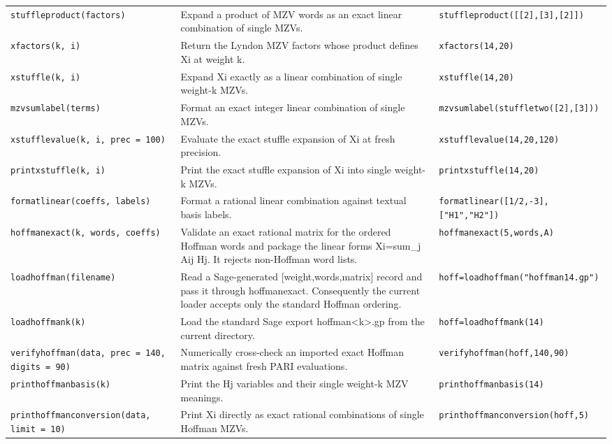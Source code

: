 \documentclass[12pt]{amsproc}
\newcommand{\code}[1]{\nolinkurl{#1}}
\begin{document}
\begin{longtable}{@{}L{0.245\textwidth}L{0.440\textwidth}L{0.245\textwidth}@{}}
\addlinespace[2pt]
\code{stuffleproduct(factors)} & Expand a product of MZV words as an exact linear combination of single MZVs. & \code{stuffleproduct([[2],[3],[2]])} \\
\addlinespace[2pt]
\code{xfactors(k, i)} & Return the Lyndon MZV factors whose product defines Xi at weight k. & \code{xfactors(14,20)} \\
\addlinespace[2pt]
\code{xstuffle(k, i)} & Expand Xi exactly as a linear combination of single weight-k MZVs. & \code{xstuffle(14,20)} \\
\addlinespace[2pt]
\code{mzvsumlabel(terms)} & Format an exact integer linear combination of single MZVs. & \code{mzvsumlabel(stuffletwo([2],[3]))} \\
\addlinespace[2pt]
\code{xstufflevalue(k, i, prec = 100)} & Evaluate the exact stuffle expansion of Xi at fresh precision. & \code{xstufflevalue(14,20,120)} \\
\addlinespace[2pt]
\code{printxstuffle(k, i)} & Print the exact stuffle expansion of Xi into single weight-k MZVs. & \code{printxstuffle(14,20)} \\
\addlinespace[2pt]
\code{formatlinear(coeffs, labels)} & Format a rational linear combination against textual basis labels. & \code{formatlinear([1/2,-3],["H1","H2"])} \\
\addlinespace[2pt]
\code{hoffmanexact(k, words, coeffs)} & Validate an exact rational matrix for the ordered Hoffman words and package the linear forms Xi=sum\_j Aij Hj. It rejects non-Hoffman word lists. & \code{hoffmanexact(5,words,A)} \\
\addlinespace[2pt]
\code{loadhoffman(filename)} & Read a Sage-generated [weight,words,matrix] record and pass it through hoffmanexact. Consequently the current loader accepts only the standard Hoffman ordering. & \code{hoff=loadhoffman("hoffman14.gp")} \\
\addlinespace[2pt]
\code{loadhoffmank(k)} & Load the standard Sage export hoffman<k>.gp from the current directory. & \code{hoff=loadhoffmank(14)} \\
\addlinespace[2pt]
\code{verifyhoffman(data, prec = 140, digits = 90)} & Numerically cross-check an imported exact Hoffman matrix against fresh PARI evaluations. & \code{verifyhoffman(hoff,140,90)} \\
\addlinespace[2pt]
\code{printhoffmanbasis(k)} & Print the Hj variables and their single weight-k MZV meanings. & \code{printhoffmanbasis(14)} \\
\addlinespace[2pt]
\code{printhoffmanconversion(data, limit = 10)} & Print Xi directly as exact rational combinations of single Hoffman MZVs. & \code{printhoffmanconversion(hoff,5)} \\

\end{longtable}
\end{document}
